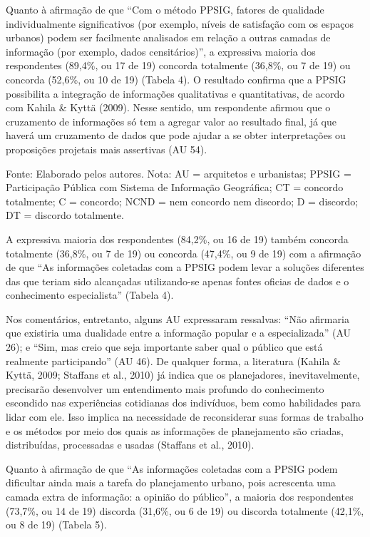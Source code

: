 \documentclass{article}
\begin{document}
Quanto à afirmação de que “Com o método PPSIG, fatores de qualidade
individualmente significativos (por exemplo, níveis de satisfação com os
espaços urbanos) podem ser facilmente analisados em relação a outras camadas
de informação (por exemplo, dados censitários)”, a expressiva
maioria dos respondentes (89,4\%, ou 17 de 19) concorda totalmente (36,8\%, ou 7
de 19) ou concorda (52,6\%, ou 10 de 19) (Tabela
4). O resultado confirma que a PPSIG possibilita a integração de
informações qualitativas e quantitativas, de acordo com Kahila \& Kyttä (2009).
Nesse sentido, um respondente
afirmou que o cruzamento de informações só tem a agregar valor ao resultado
final, já que haverá um cruzamento de dados que pode ajudar a se obter
interpretações ou proposições projetais mais assertivas (AU 54).

Fonte: Elaborado pelos autores. Nota: AU = arquitetos e urbanistas;
PPSIG = Participação Pública com Sistema de Informação Geográfica;
CT = concordo totalmente; C = concordo; NCND = nem concordo nem
discordo; D = discordo; DT = discordo totalmente.

A expressiva maioria dos respondentes (84,2\%, ou 16 de 19) também concorda
totalmente (36,8\%, ou 7 de 19) ou concorda (47,4\%, ou 9 de 19) com a afirmação
de que “As informações coletadas com a PPSIG podem levar a soluções
diferentes das que teriam sido alcançadas utilizando-se apenas fontes
oficias de dados e o conhecimento especialista” (Tabela 4).

Nos comentários, entretanto, alguns AU expressaram ressalvas: “Não
afirmaria que existiria uma dualidade entre a informação popular e a
especializada” (AU 26); e “Sim, mas creio que seja
importante saber qual o público que está realmente participando”
(AU 46). De qualquer forma, a literatura (Kahila \& Kyttä, 2009; Staffans
et al., 2010) já indica que os planejadores, inevitavelmente,
precisarão desenvolver um entendimento mais profundo do conhecimento escondido
nas experiências cotidianas dos indivíduos, bem como habilidades para lidar com
ele. Isso implica na necessidade de reconsiderar suas formas de trabalho e os
métodos por meio dos quais as informações de planejamento são criadas,
distribuídas, processadas e usadas (Staffans et
al., 2010).

Quanto à afirmação de que “As informações coletadas com a PPSIG podem
dificultar ainda mais a tarefa do planejamento urbano, pois acrescenta uma
camada extra de informação: a opinião do público”, a maioria dos
respondentes (73,7\%, ou 14 de 19) discorda (31,6\%, ou 6 de 19) ou discorda
totalmente (42,1\%, ou 8 de 19) (Tabela
5).
\end{document}
